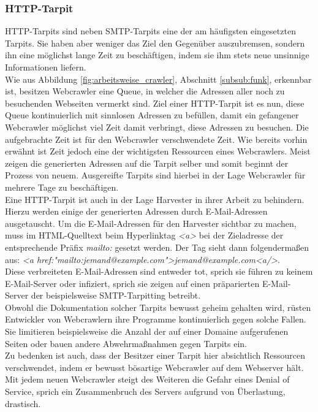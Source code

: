 \subsubsection{HTTP-Tarpit}
HTTP-Tarpits sind neben SMTP-Tarpits eine der am häufigsten eingesetzten Tarpits. Sie haben aber weniger das Ziel den Gegenüber auszubremsen, sondern ihn eine möglichst lange Zeit zu \glqq beschäftigen\grqq , indem sie ihm stets neue unsinnige Informationen liefern.\\
Wie aus Abbildung \ref{fig:arbeitsweise_crawler}, Abschnitt \ref{subsub:funk}, erkennbar ist, besitzen Webcrawler eine Queue, in welcher die Adressen aller noch zu besuchenden Webseiten vermerkt sind. Ziel einer HTTP-Tarpit ist es nun, diese Queue kontinuierlich mit sinnlosen Adressen zu befüllen, damit ein gefangener Webcrawler möglichst viel Zeit damit verbringt, diese Adressen zu besuchen. Die aufgebrachte Zeit ist für den Webcrawler verschwendete Zeit. Wie bereits vorhin erwähnt ist Zeit jedoch eine der wichtigsten Ressourcen eines Webcrawlers. Meist zeigen die generierten Adressen auf die Tarpit selber und somit beginnt der Prozess von neuem. Ausgereifte Tarpits sind hierbei in der Lage Webcrawler für mehrere Tage zu beschäftigen.\cite{tarpitting-http-linux-mag}\\
Eine HTTP-Tarpit ist auch in der Lage Harvester in ihrer Arbeit zu behindern. Hierzu werden einige der generierten Adressen durch E-Mail-Adressen ausgetauscht. Um die E-Mail-Adressen für den Harvester sichtbar zu machen, muss im HTML-Quelltext beim Hyperlinktag \emph{<a>} bei der Zieladresse der entsprechende Präfix \emph{mailto:} gesetzt werden. Der Tag sieht dann folgendermaßen aus: \emph{<a href:"mailto:jemand@example.com">jemand@example.com<a/>}.\\
Diese verbreiteten E-Mail-Adressen sind entweder \glqq tot\grqq, sprich sie führen zu keinem E-Mail-Server oder \glqq infiziert\grqq, sprich sie zeigen auf einen präparierten E-Mail-Server der beispielsweise SMTP-Tarpitting betreibt.\\
Obwohl die Dokumentation solcher Tarpits bewusst geheim gehalten wird, rüsten Entwickler von Webcrawlern ihre Programme kontinuierlich gegen solche Fallen. Sie limitieren beispielsweise die Anzahl der auf einer Domaine aufgerufenen Seiten oder bauen andere Abwehrmaßnahmen gegen Tarpits ein.\\
Zu bedenken ist auch, dass der Besitzer einer Tarpit hier absichtlich Ressourcen verschwendet, indem er bewusst bösartige Webcrawler auf dem Webserver hält. Mit jedem neuen Webcrawler steigt des Weiteren die Gefahr eines Denial of Service, sprich ein Zusammenbruch des Servers aufgrund von Überlastung, drastisch.\cite{tarpitting-http-eggendorf-auugn}\\

